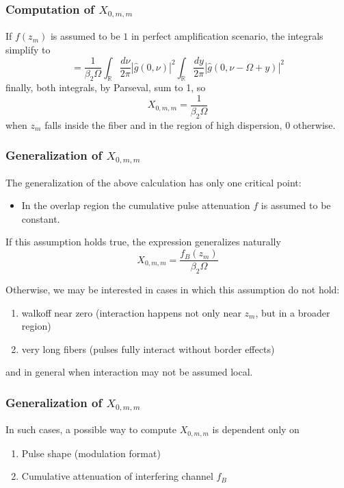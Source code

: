 \documentclass[8pt]{beamer} %
\begin{document}
\begin{frame}
    \frametitle{Computation of $X_{0, m, m}$}
    If $f(z_m)$ is assumed to be $1$ in perfect amplification scenario, the integrals simplify to
    \begin{equation}
        =\frac{1}{ \beta_2 \Omega}\int_{\mathbb{R}} \frac{d\nu}{2\pi}  |\hat{g}(0, \nu)|^2 \int_{\mathbb{R}}  \frac{dy}{2\pi} \left|\hat{g}\left(0, \nu-\Omega + y\right)\right|^2
    \end{equation}
    finally, both integrals, by Parseval, sum to 1, so
    \begin{equation}
        X_{0, m, m} = \frac{1}{\beta_2 \Omega}
    \end{equation}
    when $z_m$ falls inside the fiber and in the region of high dispersion, $0$ otherwise.
\end{frame}

\begin{frame}
    \frametitle{Generalization of $X_{0, m, m}$}
    The generalization of the above calculation has only one critical point:
    \begin{itemize}
        \item In the overlap region the cumulative pulse attenuation $f$ is assumed to be constant.
    \end{itemize}
    If this assumption holds true, the expression generalizes naturally
    \begin{equation}
        X_{0, m, m} = \frac{f_B(z_m)}{\beta_2 \Omega}
    \end{equation}

    Otherwise, we may be interested in cases in which this assumption do not hold:
    \begin{enumerate}
        \item walkoff near zero (interaction happens not only near $z_m$, but in a broader region)
        \item very long fibers (pulses fully interact without border effects)
    \end{enumerate}
    and in general when interaction may not be assumed local.
\end{frame}

\begin{frame}
    \frametitle{Generalization of $X_{0, m, m}$}
    In such cases, a possible way to compute $X_{0, m, m}$ is dependent only on
    \begin{enumerate}
        \item Pulse shape (modulation format)
        \item Cumulative attenuation of interfering channel $f_B$
    \end{enumerate}
\end{frame}
\end{document}
